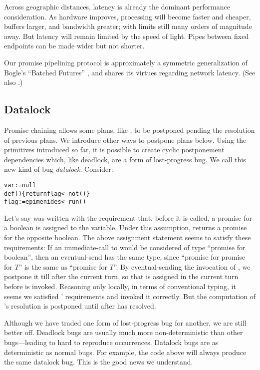 \documentclass{llncs}
\begin{document}
Across geographic distances, latency is already the dominant
performance consideration. As hardware improves, processing will
become faster and cheaper, buffers larger, and bandwidth greater; with
limits still many orders of magnitude away. But latency will remain
limited by the speed of light. Pipes between fixed endpoints can be
made wider but not shorter.

Our promise pipelining protocol is approximately a symmetric
generalization of Bogle's ``Batched Futures'' \cite{bogle:batched},
and shares its virtues regarding network latency. (See also
\cite{liskov:promises}.)

\subsection{Datalock}

Promise chaining allows some plans, like , to be postponed
pending the resolution of previous plans. We introduce other ways to
postpone plans below.  Using the primitives introduced so far, it is
possible to create cyclic postponement dependencies which, like
deadlock, are a form of lost-progress bug. We call this new kind of
bug \emph{datalock}. Consider:
%
\begin{alltt}
    var  := null
    def () \{ return flag <- not() \}
    flag := epimenides <- run()
\end{alltt}
%
Let's say  was written with the requirement that,
before it is called, a promise for a boolean is assigned to the
 variable. Under this assumption,  returns a
promise for the opposite boolean. The above assignment statement seems
to satisfy these requirements: If an immediate-call to
 would be considered of type ``promise for boolean'',
then an eventual-send has the same type, since ``promise for promise
for $T$'' is the same as ``promise for $T$''. By eventual-sending the
invocation of , we postpone it till after the current
turn, so that  is assigned in the current turn before
 is invoked. Reasoning only locally, in terms of
conventional typing, it seems we satisfied '
requirements and invoked it correctly. But the computation of
's resolution is postponed until after  has
resolved. 

Although we have traded one form of lost-progress bug for another, we
are still better off. Deadlock bugs are usually much more
non-deterministic than other bugs---leading to hard to reproduce
occurrences. Datalock bugs are as deterministic as normal
bugs.  For example, the code above will always
produce the same datalock bug. This is the good news we understand.
\end{document}
